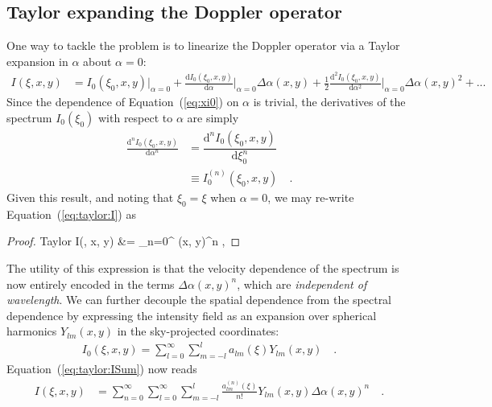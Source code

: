\documentclass[modern]{aastex62}
\begin{document}
\subsection{Taylor expanding the Doppler operator}
\label{sec:taylor}
%
One way to tackle the problem is to linearize the Doppler operator via
a Taylor expansion in $\alpha$ about $\alpha=0$:
%
\begin{align}
    \label{eq:taylor:I}
    I(\xi, x, y) 
        &=
        I_0(\xi_0, x, y) \Bigg|_{\alpha=0}
        + 
        \frac{\mathrm{d}I_0(\xi_0, x, y)}{\mathrm{d}\alpha} \Bigg|_{\alpha=0} 
            \Delta\alpha(x, y)
        + 
        \frac{1}{2}\frac{\mathrm{d}^2I_0(\xi_0, x, y)}{\mathrm{d}\alpha^2} 
            \Bigg|_{\alpha=0} \Delta\alpha(x, y)^2
        +
        ... 
\end{align}
%
Since the dependence of Equation~(\ref{eq:xi0}) on $\alpha$ is trivial,
the derivatives of the spectrum $I_0(\xi_0)$ with respect to
$\alpha$ are simply
%
\begin{align}
    \frac{\mathrm{d}^nI_0(\xi_0, x, y)}{\mathrm{d}\alpha^n} &=
    \dfrac{\mathrm{d}^nI_0(\xi_0, x, y)}{\mathrm{d}\xi_0^n} \nonumber\\ &\equiv
    I_0^{(n)}(\xi_0, x, y)
    \quad.
\end{align}
%
Given this result, and noting that $\xi_0 = \xi$ when $\alpha = 0$,
we may re-write Equation~(\ref{eq:taylor:I}) as
%
\begin{proof}{Taylor}
    \label{eq:taylor:ISum}
    I(\xi, x, y) 
        &=
        \sum_{n=0}^\infty
            \Delta\alpha(x, y)^n
        \quad ,
\end{proof}
%
The utility of this expression is that the velocity dependence of the spectrum
is now entirely encoded in the terms $\Delta\alpha(x, y)^n$, which are
\emph{independent of wavelength}. We can further decouple the spatial
dependence from the spectral dependence by expressing the intensity field
as an expansion over spherical harmonics $Y_{lm}(x, y)$ in the sky-projected
coordinates:
%
\begin{align}
    I_0(\xi, x, y) = \sum_{l=0}^\infty\sum_{m=-l}^{l} a_{lm}(\xi) Y_{lm}(x, y)
    \quad .
\end{align}
%
Equation~(\ref{eq:taylor:ISum}) now reads
%
\begin{align}
    \label{eq:taylor:IYlm}
    I(\xi, x, y) 
        &=
        \sum_{n=0}^\infty
            \sum_{l=0}^\infty\sum_{m=-l}^{l}
                \frac{a_{lm}^{(n)}(\xi)}{n!}
                Y_{lm}(x, y)\Delta\alpha(x, y)^n
            \quad .
\end{align}
\end{document}
